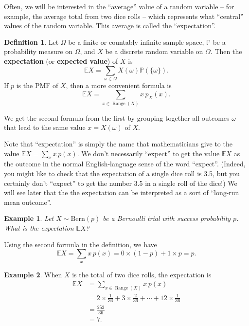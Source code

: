 \documentclass[
  a4paper,
]{book}
\theoremstyle{definition}
\newtheorem{definition}{Definition}[chapter]
\theoremstyle{definition}
\newtheorem{example}{Example}[chapter]
\theoremstyle{definition}
\theoremstyle{definition}
\theoremstyle{remark}
\begin{document}
Often, we will be interested in the ``average'' value of a random variable -- for example, the average total from two dice rolls -- which represents what ``central'' values of the random variable. This average is called the ``expectation''.

\begin{definition}
Let \(\Omega\) be a finite or countably infinite sample space, \(\mathbb P\) be a probability measure on \(\Omega\), and \(X\) be a discrete random variable on \(\Omega\). Then the \textbf{expectation} (or \textbf{expected value}) of \(X\) is
\[ \mathbb EX = \sum_{\omega \in \Omega} X(\omega) \mathbb P(\{\omega\}) . \]
If \(p\) is the PMF of \(X\), then a more convenient formula is
\[ \mathbb EX = \sum_{x \in \operatorname{Range}(X)} x\,p_X(x) . \]
\end{definition}

We get the second formula from the first by grouping together all outcomes \(\omega\) that lead to the same value \(x = X(\omega)\) of \(X\).

Note that ``expectation'' is simply the name that mathematicians give to the value \(\mathbb EX = \sum_x x\, p(x)\). We don't necessarily ``expect'' to get the value \(\mathbb EX\) as the outcome in the normal English-language sense of the word ``expect''. (Indeed, you might like to check that the expectation of a single dice roll is 3.5, but you certainly don't ``expect'' to get the number 3.5 in a single roll of the dice!) We will see later that the the expectation can be interpreted as a sort of ``long-run mean outcome''.

\begin{example}
\emph{Let \(X \sim \text{Bern}(p)\) be a Bernoulli trial with success probability \(p\). What is the expectation \(\mathbb EX\)?}

Using the second formula in the definition, we have
\[ \mathbb EX = \sum_{x} x\,p(x) = 0\times (1-p) + 1\times p = p. \]
\end{example}

\begin{example}
When \(X\) is the total of two dice rolls, the expectation is
\begin{align*}
  \mathbb EX &= \sum_{x \in \operatorname{Range}(X)} x\,p(x)  \\
    &= 2 \times \tfrac{1}{36} + 3 \times \tfrac{2}{36} + \cdots + 12 \times \tfrac{1}{36} \\
    &= \tfrac{252}{36} \\
    &= 7 .
\end{align*}
\end{example}
\end{document}
